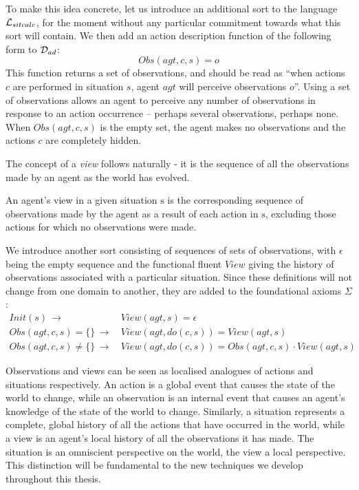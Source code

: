 To make this idea concrete, let us introduce an additional sort 
to the language $\mathcal{L}_{sitcalc}$, for the moment without any particular commitment
towards what this sort will contain. We then add an action description
function of the following form to $\mathcal{D}_{ad}$:\[
Obs(agt,c,s)=o\]
 This function returns a set of observations, and should be read as
{}``when actions $c$ are performed in situation $s$, agent $agt$
will perceive observations $o$''. Using a set of observations allows
an agent to perceive any number of observations in response to an
action occurrence -- perhaps several observations, perhaps none. When
$Obs(agt,c,s)$ is the empty set, the agent makes no observations
and the actions $c$ are completely hidden.

The concept of a \emph{view} follows naturally - it is the sequence
of all the observations made by an agent as the world has evolved.

\begin{defnL}
[{Views}] An agent's view in a given situation $\mathrm{s}$
is the corresponding sequence of observations made by the agent as
a result of each action in $\mathrm{s}$, excluding those actions
for which no observations were made. \label{defn:Observations:View} 
\end{defnL}
We introduce another sort  consisting of sequences of sets
of observations, with $\epsilon$ being the empty sequence and the
functional fluent $View$ giving the history of observations associated
with a particular situation. Since these definitions will not change
from one domain to another, they are added to the foundational axioms
$\Sigma$:\begin{align}
Init(s)\,\rightarrow & \, View(agt,s)=\epsilon\nonumber \\
Obs(agt,c,s)=\{\}\,\rightarrow & \, View(agt,do(c,s))=View(agt,s)\nonumber \\
Obs(agt,c,s)\neq\{\}\,\rightarrow & \, View(agt,do(c,s))=Obs(agt,c,s)\cdot View(agt,s)\label{eq:view_defn}\end{align}


Observations and views can be seen as localised analogues of actions
and situations respectively. An action is a global event that causes
the state of the world to change, while an observation is an internal
event that causes an agent's knowledge of the state of the world to
change. Similarly, a situation represents a complete, global history
of all the actions that have occurred in the world, while a view is
an agent's local history of all the observations it has made. The
situation is an omniscient perspective on the world, the view a local
perspective. This distinction will be fundamental to the new techniques
we develop throughout this thesis.

